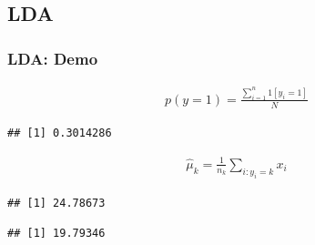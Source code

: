 \documentclass[
  shownotes,
  xcolor={svgnames},
  hyperref={colorlinks,citecolor=DarkBlue,linkcolor=DarkRed,urlcolor=DarkBlue}
  , aspectratio=169]{beamer}
\newenvironment{Shaded}{\begin{snugshade}}{\end{snugshade}}
\newcommand{\DecValTok}[1]{\textcolor[rgb]{0.00,0.00,0.81}{#1}}
\newcommand{\KeywordTok}[1]{\textcolor[rgb]{0.13,0.29,0.53}{\textbf{#1}}}
\newcommand{\NormalTok}[1]{#1}
\newcommand{\OperatorTok}[1]{\textcolor[rgb]{0.81,0.36,0.00}{\textbf{#1}}}
\begin{document}
\subsection{LDA}
\begin{frame}[fragile]
\frametitle{LDA: Demo}
\begin{scriptsize}
\begin{align}
    p(y=1) = \frac{\sum_{i=1}^n 1[y_i=1]}{N}
  \end{align}


\begin{Shaded}
\end{Shaded}
\begin{verbatim}
## [1] 0.3014286
\end{verbatim}
\end{scriptsize}
\begin{scriptsize}
\begin{align}
\hat{\mu}_k=\frac{1}{n_k}\sum_{i:y_i=k}x_i
\end{align}


\begin{Shaded}
\end{Shaded}

\begin{verbatim}
## [1] 24.78673
\end{verbatim}

\begin{Shaded}
\end{Shaded}

\begin{verbatim}
## [1] 19.79346
\end{verbatim}
\end{scriptsize}

\end{frame}
\end{document}
